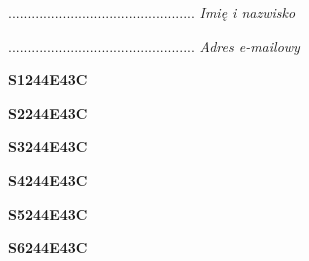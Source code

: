 \begin{turn}{90}\begin{minipage}{\linewidth} \vspace{20mm} ................................................  \textit{Imię i nazwisko}\end{minipage}\end{turn}

\begin{turn}{90}\begin{minipage}{\linewidth} \vspace{20mm} ................................................  \textit{Adres e-mailowy}\end{minipage}\end{turn}

\begin{turn}{90}\huge \begin{minipage}{\linewidth} \vspace{10mm}\textbf{S1244E43C}\end{minipage}\end{turn}

\begin{turn}{90}\huge \begin{minipage}{\linewidth} \vspace{10mm}\textbf{S2244E43C}\end{minipage}\end{turn}

\begin{turn}{90}\huge \begin{minipage}{\linewidth} \vspace{10mm}\textbf{S3244E43C}\end{minipage}\end{turn}

\begin{turn}{90}\huge \begin{minipage}{\linewidth} \vspace{10mm}\textbf{S4244E43C}\end{minipage}\end{turn}

\begin{turn}{90}\huge \begin{minipage}{\linewidth} \vspace{10mm}\textbf{S5244E43C}\end{minipage}\end{turn}

\begin{turn}{90}\huge \begin{minipage}{\linewidth} \vspace{10mm}\textbf{S6244E43C}\end{minipage}\end{turn}

